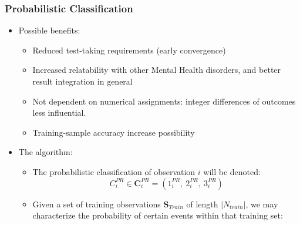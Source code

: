 \documentclass[12pt,]{article}
\providecommand{\tightlist}{%
  \setlength{\itemsep}{0pt}\setlength{\parskip}{0pt}}
\begin{document}
\hypertarget{probabilistic-classification}{%
\subsubsection{Probabilistic
Classification}\label{probabilistic-classification}}

\begin{itemize}
\tightlist
\item
  Possible benefits:

  \begin{itemize}
  \tightlist
  \item
    Reduced test-taking requirements (early convergence)
  \item
    Increased relatability with other Mental Health disorders, and
    better result integration in general
  \item
    Not dependent on numerical assignments: integer differences of
    outcomes less influential.
  \item
    Training-sample accuracy increase possibility
  \end{itemize}
\item
  The algorithm:

  \begin{itemize}
  \tightlist
  \item
    The probabilistic classification of observation \(i\) will be
    denoted:
    \[C_{i}^{PR} \in \mathbf{C}_{i}^{PR}=(1_{i}^{PR}, \ 2_{i}^{PR}, \ 3_{i}^{PR})\]
  \item
    Given a set of training observations \(\mathbf{S}_{Train}\) of
    length \(|N_{train}|\), we may characterize the probability of
    certain events within that training set:


\end{itemize}
\end{itemize}
\end{document}
